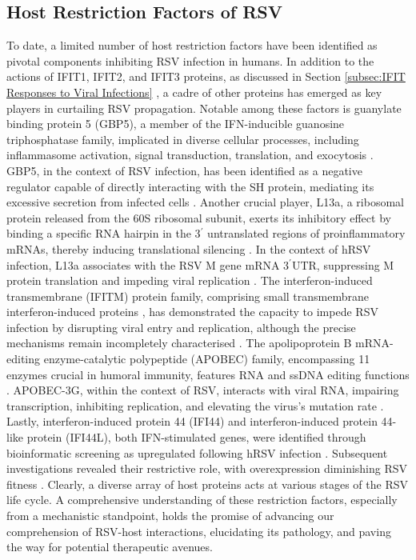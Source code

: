 \subsection{Host Restriction Factors of RSV} \label{subsec:Host Restriction Factors of RSV}
To date, a limited number of host restriction factors have been identified as pivotal components inhibiting RSV infection in humans. In addition to the actions of IFIT1, IFIT2, and IFIT3 proteins, as discussed in Section \ref{subsec:IFIT Responses to Viral Infections} \cite{Drori2020InfluenzaProteins}, a cadre of other proteins has emerged as key players in curtailing RSV propagation. Notable among these factors is guanylate binding protein 5 (GBP5), a member of the IFN-inducible guanosine triphosphatase family, implicated in diverse cellular processes, including inflammasome activation, signal transduction, translation, and exocytosis \cite{Feng2017InducibleInfection}. GBP5, in the context of RSV infection, has been identified as a negative regulator capable of directly interacting with the SH protein, mediating its excessive secretion from infected cells \cite{Li2020GBP5Virus}. Another crucial player, L13a, a ribosomal protein released from the 60S ribosomal subunit, exerts its inhibitory effect by binding a specific RNA hairpin in the 3$^{\prime}$ untranslated regions of proinflammatory mRNAs, thereby inducing translational silencing \cite{Sampath2004NoncanonicalSynthetase, Vyas2009Genome-WideMonocytes}. In the context of hRSV infection, L13a associates with the RSV M gene mRNA 3$^{\prime}$UTR, suppressing M protein translation and impeding viral replication \cite{Mazumder2014ExtraribosomalDefense}. The interferon-induced transmembrane (IFITM) protein family, comprising small transmembrane interferon-induced proteins \cite{Diamond2013TheProteins}, has demonstrated the capacity to impede RSV infection by disrupting viral entry and replication, although the precise mechanisms remain incompletely characterised \cite{Smith2019Interferon-InducedMembrane}. The apolipoprotein B mRNA-editing enzyme-catalytic polypeptide (APOBEC) family, encompassing 11 enzymes crucial in humoral immunity, features RNA and ssDNA editing functions \cite{Chelico2009StochasticAPOBEC3G}. APOBEC-3G, within the context of RSV, interacts with viral RNA, impairing transcription, inhibiting replication, and elevating the virus's mutation rate \cite{Fehrholz2012TheViruses}. Lastly, interferon-induced protein 44 (IFI44) and interferon-induced protein 44-like protein (IFI44L), both IFN-stimulated genes, were identified through bioinformatic screening as upregulated following hRSV infection \cite{McDonald2016ADisease, Li2021IdentificationVirus}. Subsequent investigations revealed their restrictive role, with overexpression diminishing RSV fitness \cite{Busse2020Interferon-InducedVirus}. Clearly, a diverse array of host proteins acts at various stages of the RSV life cycle. A comprehensive understanding of these restriction factors, especially from a mechanistic standpoint, holds the promise of advancing our comprehension of RSV-host interactions, elucidating its pathology, and paving the way for potential therapeutic avenues.

